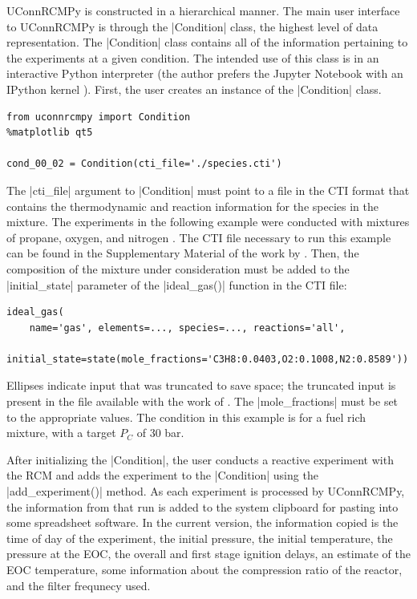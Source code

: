 \documentclass[12pt]{../ussci}
\begin{document}
UConnRCMPy is constructed in a hierarchical manner. The main user interface to
UConnRCMPy is through the \python|Condition| class, the highest level of data
representation. The \python|Condition| class contains all of the information
pertaining to the experiments at a given condition. The intended use of this
class is in an interactive Python interpreter (the author prefers the Jupyter
Notebook with an IPython kernel \autocite{Perez2007}). First, the user creates
an instance of the \python|Condition| class.

\begin{verbatim}
from uconnrcmpy import Condition
%matplotlib qt5

cond_00_02 = Condition(cti_file='./species.cti')
\end{verbatim}

The \python|cti_file| argument to \python|Condition| must point to a file in the
CTI format that contains the thermodynamic and reaction information for the
species in the mixture. The experiments in the following example were conducted
with mixtures of propane, oxygen, and nitrogen \autocite{Dames2016}. The CTI
file necessary to run this example can be found in the Supplementary Material of
the work by \textcite{Dames2016}. Then, the composition of the mixture under
consideration must be added to the \python|initial_state| parameter of the
\python|ideal_gas()| function in the CTI file:

\begin{verbatim}
ideal_gas(
    name='gas', elements=..., species=..., reactions='all',
    initial_state=state(mole_fractions='C3H8:0.0403,O2:0.1008,N2:0.8589'))
\end{verbatim}

Ellipses indicate input that was truncated to save space; the truncated input is
present in the file available with the work of \textcite{Dames2016}. The
\python|mole_fractions| must be set to the appropriate values. The condition in
this example is for a fuel rich mixture, with a target \(P_C\) of 30 bar.

After initializing the \python|Condition|, the user conducts a reactive
experiment with the RCM and adds the experiment to the \python|Condition| using
the \python|add_experiment()| method. As each experiment is processed by
UConnRCMPy, the information from that run is added to the system clipboard for
pasting into some spreadsheet software. In the current version, the information
copied is the time of day of the experiment, the initial pressure, the initial
temperature, the pressure at the EOC, the overall and first stage ignition
delays, an estimate of the EOC temperature, some information about the
compression ratio of the reactor, and the filter frequnecy used.
\end{document}
